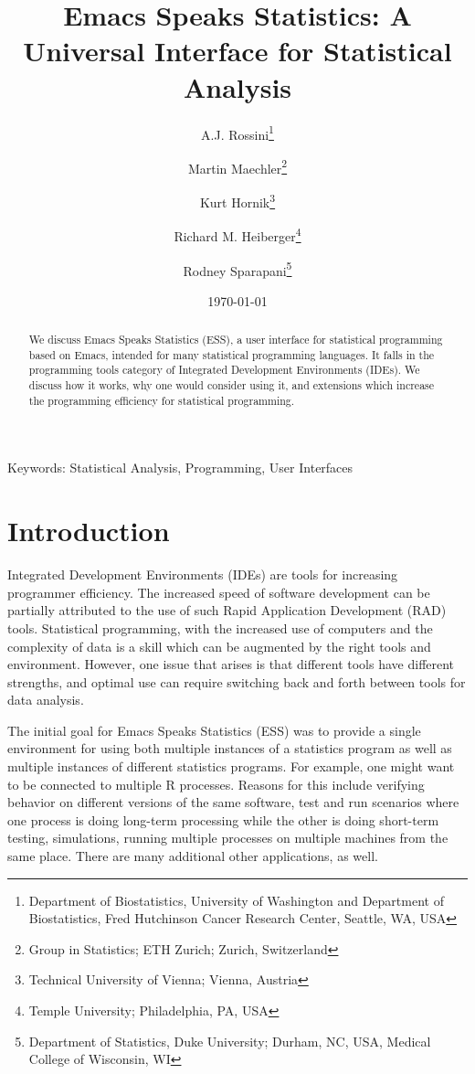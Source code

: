 \documentclass{article}
\title{Emacs Speaks Statistics: A Universal Interface for
  Statistical Analysis}
\author{A.J. Rossini\footnote{Department of Biostatistics, University
    of Washington and Department of Biostatistics, Fred Hutchinson
    Cancer Research Center, Seattle, WA, USA} \and Martin
  Maechler\footnote{Group  in Statistics; ETH Zurich; Zurich,
    Switzerland} \and Kurt 
  Hornik\footnote{Technical University of Vienna; Vienna, Austria} \and
  Richard M. Heiberger\footnote{Temple University; Philadelphia, PA,
    USA} \and Rodney Sparapani\footnote{Department of Statistics, Duke
    University; Durham, NC, USA, Medical College of Wisconsin, WI}}
\date{\today}
\newif\ifpdf
\begin{document}
\ifpdf
  \DeclareGraphicsExtensions{.jpg,.pdf,.png,.mps}
\fi


\maketitle

Keywords: Statistical Analysis, Programming, User Interfaces

\begin{abstract}
  We discuss Emacs Speaks Statistics (ESS), a user interface for
  statistical programming based on Emacs, intended for many
  statistical programming languages.  It falls in the programming
  tools category of Integrated Development Environments (IDEs).  We
  discuss how it works, why one would consider using it, and
  extensions which increase the programming efficiency for statistical
  programming.
\end{abstract}

\section{Introduction}
\label{sec:intro}

Integrated Development Environments (IDEs) are tools for increasing
programmer efficiency.  The increased speed of software development
can be partially attributed to the use of such Rapid Application
Development (RAD) tools.  Statistical programming, with the increased
use of computers and the complexity of data is a skill which can be
augmented by the right tools and environment.  However, one issue that
arises is that different tools have different strengths, and optimal
use can require switching back and forth between tools for data
analysis.

The initial goal for Emacs Speaks Statistics (ESS) was to provide a
single environment for using both multiple instances of a statistics
program as well as multiple instances of different statistics
programs.  For example, one might want to be connected to multiple R
\citep{ihak:gent:1996} processes.  Reasons for this include
verifying behavior on different versions of the same software, test
and run scenarios where one process is doing long-term processing
while the other is doing short-term testing, simulations, running
multiple processes on multiple machines from the same place.  There
are many additional other applications, as well.
\end{document}
